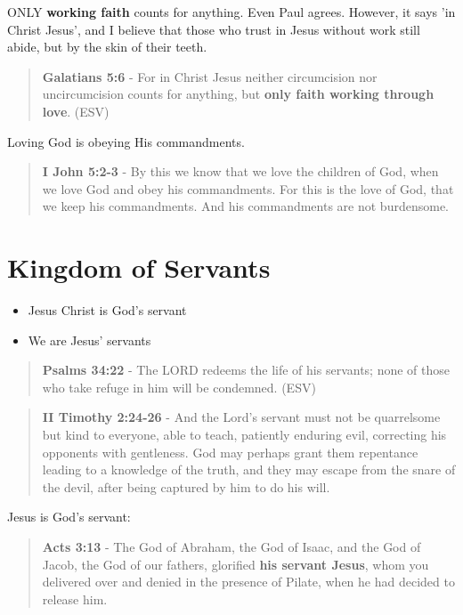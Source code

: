 \documentclass[11pt]{article}
\begin{document}
ONLY \textbf{working faith} counts for anything. Even Paul agrees. However, it says 'in Christ Jesus', and I believe that those who trust in Jesus without work still abide, but by the skin of their teeth.

\begin{quote}
\textbf{Galatians 5:6} - For in Christ Jesus neither circumcision nor uncircumcision counts for anything, but \textbf{only faith working through love}. (ESV)
\end{quote}

Loving God is obeying His commandments.

\begin{quote}
\textbf{I John 5:2-3} - By this we know that we love the children of God, when we love God and obey his commandments. For this is the love of God, that we keep his commandments. And his commandments are not burdensome.
\end{quote}

\section{Kingdom of Servants}
\label{sec:org3e33848}
\begin{itemize}
\item Jesus Christ is God's servant
\item We are Jesus' servants
\end{itemize}

\begin{quote}
\textbf{Psalms 34:22} - The LORD redeems the life of his servants; none of those who take refuge in him will be condemned. (ESV)
\end{quote}

\begin{quote}
\textbf{II Timothy 2:24-26} - And the Lord's servant must not be quarrelsome but kind to everyone, able to teach, patiently enduring evil, correcting his opponents with gentleness. God may perhaps grant them repentance leading to a knowledge of the truth, and they may escape from the snare of the devil, after being captured by him to do his will.
\end{quote}

Jesus is God's servant:

\begin{quote}
\textbf{Acts 3:13} - The God of Abraham, the God of Isaac, and the God of Jacob, the God of our fathers, glorified \textbf{his servant Jesus}, whom you delivered over and denied in the presence of Pilate, when he had decided to release him.
\end{quote}
\end{document}
